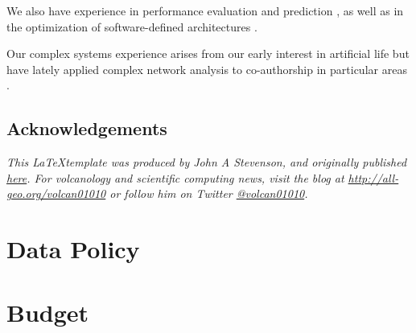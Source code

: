 \documentclass[a4paper,12pt,twocolumn]{article}
\begin{document}
We also have experience in performance evaluation and prediction
\cite{castillo:evostar08,hardwareevo}, as well as in the optimization of
software-defined architectures \cite{gecco08:castillo}.

Our complex systems experience arises from our early interest in
artificial life \cite{ecal93} but have lately applied complex network
analysis to co-authorship in particular areas
\cite{ec-network-2007,merelo2013complex,DBLP:journals/corr/abs-1108-0261}. 

\subsection*{Acknowledgements}
\textit{This \LaTeX template was produced by John A Stevenson, and originally published \href{http://all-geo.org/volcan01010/2013/07/grant-applications-are-hard-work-includes-latex-template}{here}.  For volcanology and scientific computing news, visit the blog at \href{http://all-geo.org/volcan01010}{http://all-geo.org/volcan01010} or follow him on Twitter \href{https://twitter.com/volcan01010}{@volcan01010}.}


\twocolumn[
  \begin{@twocolumnfalse}

\end{@twocolumnfalse}
]

\section{Data Policy}

\section{Budget}
\end{document}
